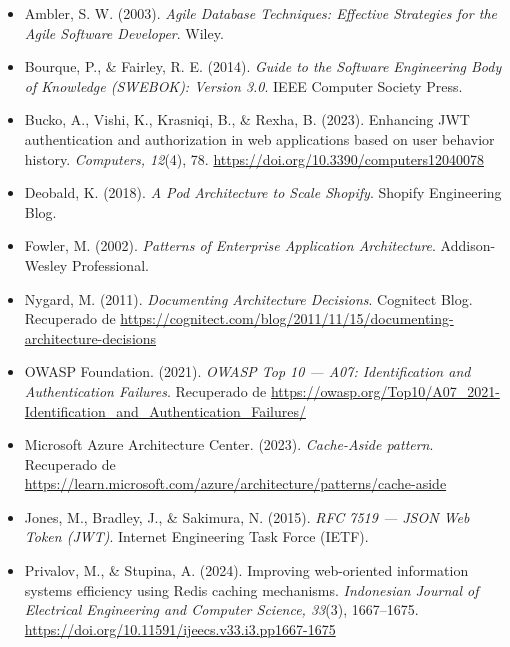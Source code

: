 \documentclass[12pt]{article}
\begin{document}
	\begin{itemize}[leftmargin=2.5cm, label={}]
		\item Ambler, S. W. (2003). \textit{Agile Database Techniques: Effective Strategies for the Agile Software Developer}. Wiley.
		
		\item Bourque, P., \& Fairley, R. E. (2014). \textit{Guide to the Software Engineering Body of Knowledge (SWEBOK): Version 3.0}. IEEE Computer Society Press.
		
		\item Bucko, A., Vishi, K., Krasniqi, B., \& Rexha, B. (2023). Enhancing JWT authentication and authorization in web applications based on user behavior history. \textit{Computers, 12}(4), 78. \url{https://doi.org/10.3390/computers12040078}
		
		\item Deobald, K. (2018). \textit{A Pod Architecture to Scale Shopify}. Shopify Engineering Blog.
		
		\item Fowler, M. (2002). \textit{Patterns of Enterprise Application Architecture}. Addison-Wesley Professional.
		
		\item Nygard, M. (2011). \textit{Documenting Architecture Decisions}. Cognitect Blog. Recuperado de \url{https://cognitect.com/blog/2011/11/15/documenting-architecture-decisions}
		
		\item OWASP Foundation. (2021). \textit{OWASP Top 10 — A07: Identification and Authentication Failures}. Recuperado de \url{https://owasp.org/Top10/A07_2021-Identification_and_Authentication_Failures/}
		
		\item Microsoft Azure Architecture Center. (2023). \textit{Cache-Aside pattern}. Recuperado de \url{https://learn.microsoft.com/azure/architecture/patterns/cache-aside}
		
		\item Jones, M., Bradley, J., \& Sakimura, N. (2015). \textit{RFC 7519 — JSON Web Token (JWT)}. Internet Engineering Task Force (IETF).
		
		\item Privalov, M., \& Stupina, A. (2024). Improving web-oriented information systems efficiency using Redis caching mechanisms. \textit{Indonesian Journal of Electrical Engineering and Computer Science, 33}(3), 1667--1675. \url{https://doi.org/10.11591/ijeecs.v33.i3.pp1667-1675}
	\end{itemize}
	
\end{document}
